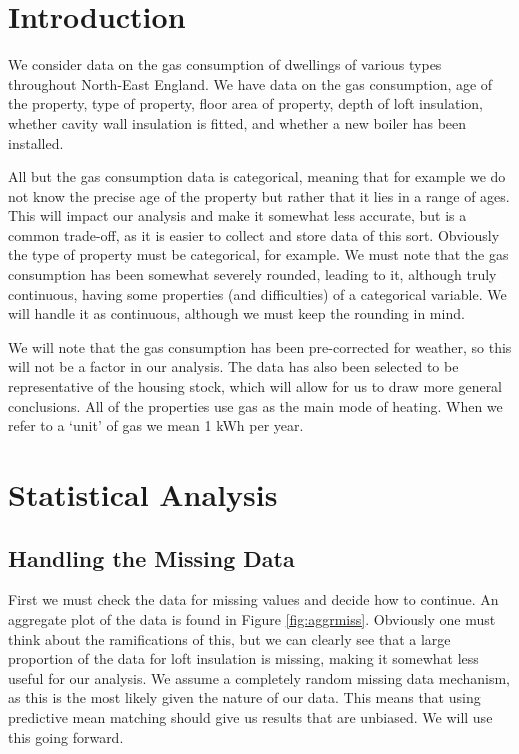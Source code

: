 \documentclass[8pt]{extarticle}
\begin{document}
\section{Introduction}

We consider data on the gas consumption of dwellings of various types throughout North-East England. We have data on the gas consumption, age of the property, type of property, floor area of property, depth of loft insulation, whether cavity wall insulation is fitted, and whether a new boiler has been installed.

All but the gas consumption data is categorical, meaning that for example we do not know the precise age of the property but rather that it lies in a range of ages. This will impact our analysis and make it somewhat less accurate, but is a common trade-off, as it is easier to collect and store data of this sort. Obviously the type of property must be categorical, for example. We must note that the gas consumption has been somewhat severely rounded, leading to it, although truly continuous, having some properties (and difficulties) of a categorical variable. We will handle it as continuous, although we must keep the rounding in mind.

We will note that the gas consumption has been pre-corrected for weather, so this will not be a factor in our analysis. The data has also been selected to be representative of the housing stock, which will allow for us to draw more general conclusions. All of the properties use gas as the main mode of heating. When we refer to a `unit' of gas we mean 1 kWh per year.

\section{Statistical Analysis}

\subsection{Handling the Missing Data}

First we must check the data for missing values and decide how to continue. An aggregate plot of the data is found in Figure \ref{fig:aggrmiss}. Obviously one must think about the ramifications of this, but we can clearly see that a large proportion of the data for loft insulation is missing, making it somewhat less useful for our analysis. We assume a completely random missing data mechanism, as this is the most likely given the nature of our data. This means that using predictive mean matching should give us results that are unbiased. We will use this going forward.
\end{document}
